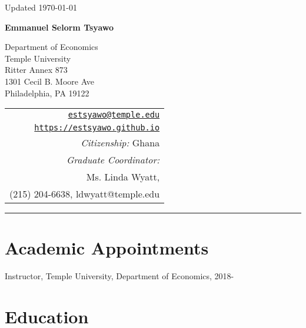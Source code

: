 \documentclass[letterpaper]{article}
\def\name{Emmanuel Selorm Tsyawo}
\renewenvironment{itemize}{
  \begin{list}{}{
    \setlength{\leftmargin}{1.5em}
  }
}{
  \end{list}
}
\begin{document}
\begin{minipage}{\linewidth}
  \begin{flushright}
    Updated \today
  \end{flushright}
\end{minipage}

\vspace{10pt}


\centerline{\huge \bf \name}

\vspace{0.25in}

\begin{minipage}{0.65\linewidth}
  Department of Economics \\
  Temple University \\
  Ritter Annex 873 \\
  1301 Cecil B. Moore Ave \\
  Philadelphia, PA 19122
\end{minipage}
\begin{minipage}{0.5\linewidth}
  \begin{tabular}{r}
    \href{mailto:estsyawo@temple.edu.edu}{\tt estsyawo@temple.edu} \\
    \href{https://estsyawo.github.io}{\tt https://estsyawo.github.io} \\
    \emph{Citizenship:} Ghana\\
    \emph{Graduate Coordinator:} \\
    Ms. Linda Wyatt, \\
    (215) 204-6638, {\color{blue} ldwyatt@temple.edu}
    
  \end{tabular}
\end{minipage}

\vspace{10pt}
\rule{\linewidth}{0.4pt}


\section*{Academic Appointments}
\begin{itemize}
  \item Instructor, Temple University, Department of Economics, 2018-
\end{itemize}

\section*{Education}
\end{document}
